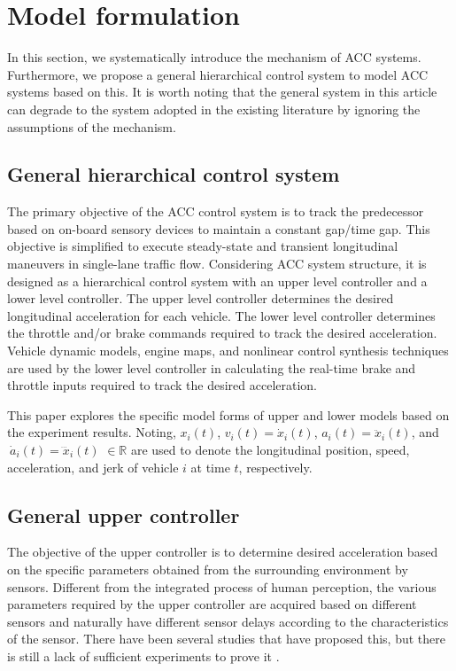 \documentclass[a4paper]{cas-sc}
\begin{document}
\section{Model formulation}
\label{Section 2}
In this section, we systematically introduce the mechanism of ACC systems. Furthermore, we propose a general hierarchical control system to model ACC systems based on this. It is worth noting that the general system in this article can degrade to the system adopted in the existing literature by ignoring the assumptions of the mechanism.

\subsection{General hierarchical control system}
\label{Section 2.1}


The primary objective of the ACC control system is to track the predecessor based on on-board sensory devices to maintain a constant gap/time gap. This objective is simplified to execute steady-state and transient longitudinal maneuvers in single-lane traffic flow. Considering ACC system structure, it is designed as a hierarchical control system with an upper level controller and a lower level controller. The upper level controller determines the desired longitudinal acceleration for each vehicle. The lower level controller determines the throttle and/or brake commands required to track the desired acceleration. Vehicle dynamic models, engine maps, and nonlinear control synthesis techniques \citep{Choi1995,Choi1995a,Hedrick1991,Hedrick1993} are used by the lower level controller in calculating the real-time brake and throttle inputs required to track the desired acceleration.

This paper explores the specific model forms of upper and lower models based on the experiment results. Noting, $x_i\left(t\right)$, $v_i\left(t\right)={\dot{x}}_i\left(t\right)$, $a_i\left(t\right)={\ddot{x}}_i\left(t\right)$, and $\ {\dot{a}}_i\left(t\right)={\dddot{x}}_i\left(t\right)$ $\in\mathbb{R}$ are used to denote the longitudinal position, speed, acceleration, and jerk of vehicle $i$ at time $t$, respectively.

\subsection{General upper controller}
\label{Section 2.2}

The objective of the upper controller is to determine desired acceleration based on the specific parameters obtained from the surrounding environment by sensors. Different from the integrated process of human perception, the various parameters required by the upper controller are acquired based on different sensors and naturally have different sensor delays according to the characteristics of the sensor. There have been several studies that have proposed this, but there is still a lack of sufficient experiments to prove it \citep{Ngoduy2013a,Yao2021}.
\end{document}
